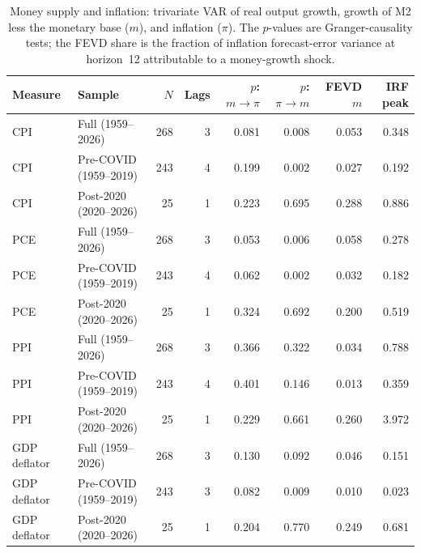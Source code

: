 \begin{table}[htbp]
\centering
\setlength{\belowcaptionskip}{8pt}
\footnotesize
\setlength{\tabcolsep}{4pt}
\caption{Money supply and inflation: trivariate VAR of real output growth, growth of M2 less the monetary base ($m$), and inflation ($\pi$). The $p$-values are Granger-causality tests; the FEVD share is the fraction of inflation forecast-error variance at horizon~12 attributable to a money-growth shock.}
\label{tab:task1}
\begin{tabular}{llrrrrrr}
\toprule
Measure & Sample & $N$ & Lags & $p$: $m\!\to\!\pi$ & $p$: $\pi\!\to\!m$ & FEVD $m$ & IRF peak \\
\midrule
CPI & Full (1959--2026) & 268 & 3 & 0.081 & 0.008 & 0.053 & 0.348 \\
CPI & Pre-COVID (1959--2019) & 243 & 4 & 0.199 & 0.002 & 0.027 & 0.192 \\
CPI & Post-2020 (2020--2026) & 25 & 1 & 0.223 & 0.695 & 0.288 & 0.886 \\
PCE & Full (1959--2026) & 268 & 3 & 0.053 & 0.006 & 0.058 & 0.278 \\
PCE & Pre-COVID (1959--2019) & 243 & 4 & 0.062 & 0.002 & 0.032 & 0.182 \\
PCE & Post-2020 (2020--2026) & 25 & 1 & 0.324 & 0.692 & 0.200 & 0.519 \\
PPI & Full (1959--2026) & 268 & 3 & 0.366 & 0.322 & 0.034 & 0.788 \\
PPI & Pre-COVID (1959--2019) & 243 & 4 & 0.401 & 0.146 & 0.013 & 0.359 \\
PPI & Post-2020 (2020--2026) & 25 & 1 & 0.229 & 0.661 & 0.260 & 3.972 \\
GDP deflator & Full (1959--2026) & 268 & 3 & 0.130 & 0.092 & 0.046 & 0.151 \\
GDP deflator & Pre-COVID (1959--2019) & 243 & 3 & 0.082 & 0.009 & 0.010 & 0.023 \\
GDP deflator & Post-2020 (2020--2026) & 25 & 1 & 0.204 & 0.770 & 0.249 & 0.681 \\
\bottomrule
\end{tabular}
\end{table}

